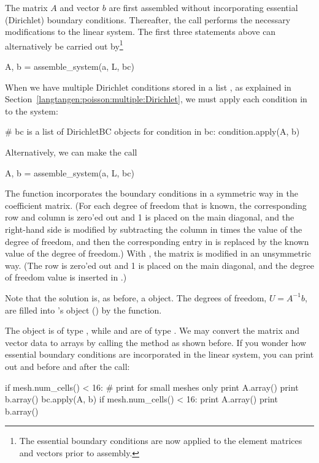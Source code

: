 The matrix $A$ and vector $b$ are first assembled without
incorporating essential (Dirichlet) boundary conditions. Thereafter,
the  call performs the
necessary modifications to the linear system. The first three
statements above can alternatively be carried out by\footnote{The
  essential boundary conditions are now applied to the element
  matrices and vectors prior to assembly.}
\begin{python}
A, b = assemble_system(a, L, bc)
\end{python}

When we have multiple Dirichlet conditions stored in a list
, as explained in
Section~\ref{langtangen:poisson:multiple:Dirichlet}, we must apply
each condition in  to the system:
\begin{python}
# bc is a list of DirichletBC objects
for condition in bc:
    condition.apply(A, b)
\end{python}
Alternatively, we can make the call
\begin{python}
A, b = assemble_system(a, L, bc)
\end{python}
The  function incorporates the boundary conditions in
a symmetric way in the coefficient matrix. (For each degree of freedom
that is known, the corresponding row and column is zero'ed out and 1
is placed on the main diagonal, and the right-hand side  is
modified by subtracting the column in  times the value of the
degree of freedom, and then the corresponding entry in  is replaced by the
known value of the degree of freedom.) With , the
matrix  is modified in an unsymmetric way. (The row is zero'ed out
and 1 is placed on the main diagonal, and the degree of freedom value
is inserted in .)


Note that the solution  is, as before,
a  object.  The degrees of
freedom, $U=A^{-1}b$, are filled into
's
 object
() by the
 function.

The object  is of type
, while
 and
 are of type
. We may convert the matrix and
vector data to  arrays by calling
the  method as shown before. If
you wonder how essential boundary conditions are incorporated in the
linear system, you can print out  and
 before and after the
 call:
\begin{python}
if mesh.num_cells() < 16:  # print for small meshes only
    print A.array()
    print b.array()
bc.apply(A, b)
if mesh.num_cells() < 16:
    print A.array()
    print b.array()
\end{python}

